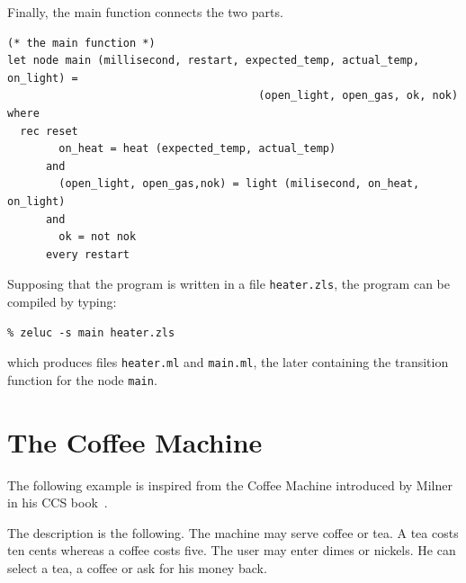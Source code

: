 \documentclass[11pt,titlepage,twoside]{report}
\begin{document}
Finally, the main function connects the two parts.

\begin{verbatim}
(* the main function *)
let node main (millisecond, restart, expected_temp, actual_temp, on_light) =
                                       (open_light, open_gas, ok, nok) where
  rec reset
        on_heat = heat (expected_temp, actual_temp)
      and
        (open_light, open_gas,nok) = light (milisecond, on_heat, on_light)
      and
        ok = not nok       
      every restart
\end{verbatim}

Supposing that the program is written in a file \verb-heater.zls-, the
program can be compiled by typing:

\begin{verbatim}
% zeluc -s main heater.zls
\end{verbatim}
which produces files \verb-heater.ml- and \verb-main.ml-, the later
containing the transition function for the node \verb-main-.
 
\section{The Coffee Machine}
The following example is inspired from the Coffee Machine introduced
by Milner in his CCS book~\cite{milner:ccs-book89}.

The description is the following. The machine may serve coffee or tea.
A tea costs ten cents whereas a coffee costs five. The user may enter
dimes or nickels. He can select a tea, a coffee or ask for his money back.
\end{document}
